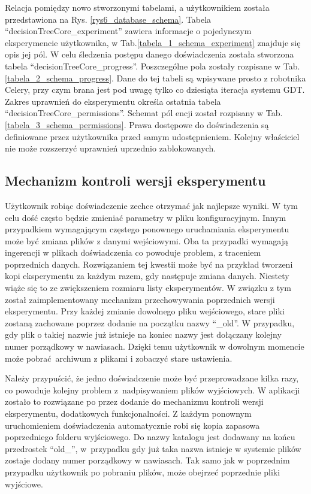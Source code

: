 Relacja pomiędzy nowo stworzonymi tabelami, a użytkownikiem została przedstawiona na Rys. \ref{rys6_database_schema}. Tabela \enquote{decisionTreeCore\_experiment} zawiera informacje o pojedynczym eksperymencie użytkownika, w Tab.\ref{tabela_1_schema_experiment} znajduje się opis jej pól. W celu śledzenia postępu danego doświadczenia została stworzona tabela \enquote{decisionTreeCore\_progress}. Poszczególne pola zostały rozpisane w Tab.\ref{tabela_2_schema_progress}. Dane do tej tabeli są wpisywane prosto z robotnika Celery, przy czym brana jest pod uwagę tylko co dziesiąta iteracja systemu GDT. Zakres uprawnień do eksperymentu określa ostatnia tabela \enquote{decisionTreeCore\_permissions}. Schemat pól encji został rozpisany w Tab.\ref{tabela_3_schema_permissions}. Prawa dostępowe do doświadczenia są definiowane przez użytkownika przed samym udostępnieniem. Kolejny właściciel nie może rozszerzyć uprawnień uprzednio zablokowanych.  





\subsection{Mechanizm kontroli wersji eksperymentu}
Użytkownik robiąc doświadczenie zechce otrzymać jak najlepsze wyniki. W tym celu dość często będzie zmieniać parametry w pliku konfiguracyjnym. Innym przypadkiem wymagającym częstego ponownego uruchamiania eksperymentu może być zmiana plików z danymi wejściowymi. Oba ta przypadki wymagają ingerencji w plikach doświadczenia co powoduje problem, z traceniem poprzednich danych. Rozwiązaniem tej kwestii może być na przykład tworzeni kopi eksperymentu za każdym razem, gdy następuje zmiana danych. Niestety wiąże się to ze zwiększeniem rozmiaru listy eksperymentów. W związku z tym został zaimplementowany mechanizm przechowywania poprzednich wersji eksperymentu. Przy każdej zmianie dowolnego pliku wejściowego, stare pliki zostaną zachowane poprzez dodanie na początku nazwy \enquote{\_old}. W przypadku, gdy plik o takiej nazwie już istnieje na koniec nazwy jest dołączany kolejny numer porządkowy w nawiasach. Dzięki temu użytkownik w dowolnym momencie może pobrać archiwum z plikami i zobaczyć stare ustawienia.

Należy przypuścić, że jedno doświadczenie może być przeprowadzane kilka razy, co powoduje kolejny problem z~nadpisywaniem plików wyjściowych. W aplikacji zostało to rozwiązane po przez dodanie do mechanizmu kontroli wersji eksperymentu, dodatkowych funkcjonalności. Z każdym ponownym uruchomieniem doświadczenia automatycznie robi się kopia zapasowa poprzedniego folderu wyjściowego. Do nazwy katalogu jest dodawany na końcu przedrostek \enquote{old\_}, w~przypadku gdy już taka nazwa istnieje w systemie plików zostaje dodany numer porządkowy w nawiasach. Tak samo jak w poprzednim przypadku użytkownik po pobraniu plików, może obejrzeć poprzednie pliki wyjściowe. 

